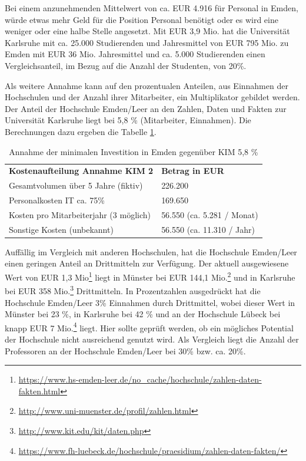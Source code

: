 Bei einem anzunehmenden Mittelwert von ca. EUR 4.916 für Personal in Emden, würde etwas mehr Geld für die Position Personal benötigt oder es wird eine weniger oder eine halbe Stelle angesetzt. Mit EUR 3,9 Mio. hat die Universität Karlsruhe mit ca. 25.000 Studierenden und Jahresmittel von EUR 795 Mio.  zu Emden mit EUR 36 Mio. Jahresmittel und ca. 5.000 Studierenden einen Vergleichsanteil, im Bezug auf die Anzahl der Studenten, von 20\%.


Als weitere Annahme kann auf den prozentualen Anteilen, aus Einnahmen der Hochschulen und der Anzahl ihrer Mitarbeiter,
ein Multiplikator gebildet werden. Der Anteil der Hochschule Emden/Leer an den Zahlen, Daten und Fakten zur Universität Karlsruhe liegt bei 5,8 \% (Mitarbeiter, Einnahmen). Die Berechnungen dazu ergeben die Tabelle \ref{tab_kostenaufteilung_emden_KIM2}.

\begin{table}[h!]
	\begin{tabularx}{\textwidth}{l|l}
		\hline
		\textbf{Kostenaufteilung Annahme KIM 2} & \textbf{Betrag in EUR}\\
		Gesamtvolumen über 5 Jahre (fiktiv) & 226.200\\
		Personalkosten IT ca. 75\% & 169.650\\
		Kosten pro Mitarbeiterjahr (3 möglich) & 56.550 (ca. 5.281 / Monat)\\ 
		Sonstige Kosten (unbekannt) & 56.550 (ca. 11.310 / Jahr)\\
		\hline
	\end{tabularx}
	\caption{Annahme der minimalen Investition in Emden gegenüber KIM 5,8 \%}
	\label{tab_kostenaufteilung_emden_KIM2}
\end{table}

Auffällig im Vergleich mit anderen Hochschulen, hat die Hochschule Emden/Leer einen geringen Anteil an Drittmitteln zur Verfügung. Der aktuell ausgewiesene Wert von EUR 1,3 Mio\footnote{\url{https://www.hs-emden-leer.de/no_cache/hochschule/zahlen-daten-fakten.html}} liegt in Münster bei EUR 144,1 Mio.\footnote{\url{http://www.uni-muenster.de/profil/zahlen.html}} und in Karlsruhe bei EUR 358 Mio.\footnote{\url{http://www.kit.edu/kit/daten.php}} Drittmitteln. In Prozentzahlen ausgedrückt hat die Hochschule Emden/Leer 3\% Einnahmen durch Drittmittel, wobei dieser Wert in Münster bei 23 \%, in Karlsruhe bei 42 \% und an der Hochschule Lübeck bei knapp EUR 7 Mio.\footnote{\url{https://www.fh-luebeck.de/hochschule/praesidium/zahlen-daten-fakten/}} liegt. Hier sollte geprüft werden, ob ein mögliches Potential der Hochschule nicht ausreichend genutzt wird. Als Vergleich liegt die Anzahl der Professoren an der Hochschule Emden/Leer bei 30\% bzw. ca. 20\%.

